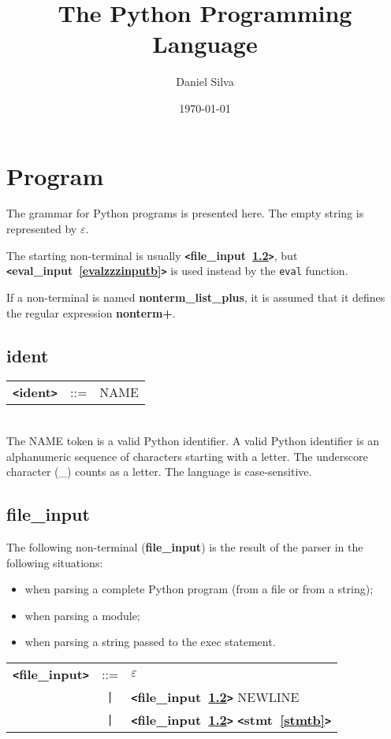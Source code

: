 \documentclass[12pt]{article}
\title{The Python Programming Language}
\author{Daniel Silva}
\date{\today}
\begin{document}
\maketitle
\tableofcontents
\newpage

\section{Program}
The grammar for Python programs is presented here.  The empty string is represented by $\varepsilon$.

The starting non-terminal is usually {\bf \verb+<+file\_input~\ref{filezzzinputb}\verb+>+}, but {\bf \verb+<+eval\_input~\ref{evalzzzinputb}\verb+>+} is used instead by the \verb|eval| function.

If a non-terminal is named {\bf nonterm\_list\_plus}, it is assumed that it defines the regular expression {\bf nonterm+}.

\subsection{ident}
\label{identb}
\begin{tabular}{lcl}
{\bf \verb+<+ident\verb+>+} & ::=  & NAME \\
\end{tabular} \\

The NAME token is a valid Python identifier.  A valid Python identifier is an alphanumeric sequence of characters starting with a letter.  The underscore character (\_) counts as a letter.  The language is case-sensitive.

\subsection{file\_input}
\label{filezzzinputb}
The following non-terminal ({\bf file\_{}input}) is the result of the parser in the following situations:
\begin{itemize}
\item when parsing a complete Python program (from a file or from a string);
\item when parsing a module;
\item when parsing a string passed to the exec statement.
\end{itemize}

\begin{tabular}{lcl}
{\bf \verb+<+file\_input\verb+>+} & ::=  & $\varepsilon$ \\
 & \verb+|+  & {\bf \verb+<+file\_input~\ref{filezzzinputb}\verb+>+}  NEWLINE \\
 & \verb+|+  & {\bf \verb+<+file\_input~\ref{filezzzinputb}\verb+>+}  {\bf \verb+<+stmt~\ref{stmtb}\verb+>+}  \\
\end{tabular}
\end{document}
